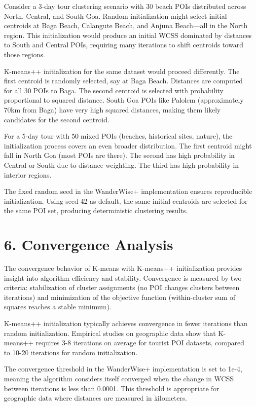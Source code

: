 Consider a 3-day tour clustering scenario with 30 beach POIs distributed across North, Central, and South Goa. Random initialization might select initial centroids at Baga Beach, Calangute Beach, and Anjuna Beach—all in the North region. This initialization would produce an initial WCSS dominated by distances to South and Central POIs, requiring many iterations to shift centroids toward those regions.

K-means++ initialization for the same dataset would proceed differently. The first centroid is randomly selected, say at Baga Beach. Distances are computed for all 30 POIs to Baga. The second centroid is selected with probability proportional to squared distance. South Goa POIs like Palolem (approximately 70km from Baga) have very high squared distances, making them likely candidates for the second centroid.

For a 5-day tour with 50 mixed POIs (beaches, historical sites, nature), the initialization process covers an even broader distribution. The first centroid might fall in North Goa (most POIs are there). The second has high probability in Central or South due to distance weighting. The third has high probability in interior regions.

The fixed random seed in the WanderWise+ implementation ensures reproducible initialization. Using seed 42 as default, the same initial centroids are selected for the same POI set, producing deterministic clustering results.

\section{6. Convergence Analysis}

The convergence behavior of K-means with K-means++ initialization provides insight into algorithm efficiency and stability. Convergence is measured by two criteria: stabilization of cluster assignments (no POI changes clusters between iterations) and minimization of the objective function (within-cluster sum of squares reaches a stable minimum).

K-means++ initialization typically achieves convergence in fewer iterations than random initialization. Empirical studies on geographic data show that K-means++ requires 3-8 iterations on average for tourist POI datasets, compared to 10-20 iterations for random initialization.

The convergence threshold in the WanderWise+ implementation is set to 1e-4, meaning the algorithm considers itself converged when the change in WCSS between iterations is less than 0.0001. This threshold is appropriate for geographic data where distances are measured in kilometers.

